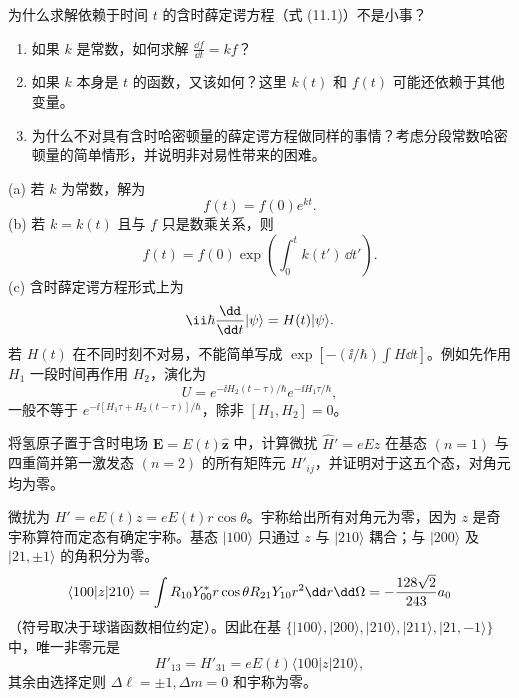 \begin{question}
为什么求解依赖于时间 $t$ 的含时薛定谔方程（式 (11.1)）不是小事？
\begin{enumerate}
\item 如果 $k$ 是常数，如何求解 $\frac{\dd f}{\dd t}=kf$？
\item 如果 $k$ 本身是 $t$ 的函数，又该如何？这里 $k(t)$ 和 $f(t)$ 可能还依赖于其他变量。
\item 为什么不对具有含时哈密顿量的薛定谔方程做同样的事情？考虑分段常数哈密顿量的简单情形，并说明非对易性带来的困难。
\end{enumerate}

\par\smallskip
{}

\end{question}
\begin{solution}
(a) 若 $k$ 为常数，解为
\[
f(t)=f(0)e^{kt}.
\]
(b) 若 $k=k(t)$ 且与 $f$ 只是数乘关系，则
\[
f(t)=f(0)\exp\left(\int_0^t k(t')\,\dd t'\right).
\]
(c) 含时薛定谔方程形式上为
\[
\ii\hbar{\dd\over\dd t}|\psi\rangle=H(t)|\psi\rangle.
\]
若 $H(t)$ 在不同时刻不对易，不能简单写成 $\exp[-(\ii/\hbar)\int H\dd t]$。例如先作用 $H_1$ 一段时间再作用 $H_2$，演化为
\[
U=e^{-\ii H_2(t-\tau)/\hbar}e^{-\ii H_1\tau/\hbar},
\]
一般不等于 $e^{-\ii[H_1\tau+H_2(t-\tau)]/\hbar}$，除非 $[H_1,H_2]=0$。
\end{solution}

\begin{question}
将氢原子置于含时电场 $\mathbf E=E(t)\hat{\mathbf z}$ 中，计算微扰 $\hat H'=eEz$ 在基态 $(n=1)$ 与四重简并第一激发态 $(n=2)$ 的所有矩阵元 $H'_{ij}$，并证明对于这五个态，对角元均为零。
\end{question}
\begin{solution}
微扰为 $H'=eE(t)z=eE(t)r\cos\theta$。宇称给出所有对角元为零，因为 $z$ 是奇宇称算符而定态有确定宇称。基态 $|100\rangle$ 只通过 $z$ 与 $|210\rangle$ 耦合；与 $|200\rangle$ 及 $|21,\pm1\rangle$ 的角积分为零。
\[
\langle100|z|210\rangle=\int R_{10}Y_{00}^*r\cos\theta R_{21}Y_{10}r^2\dd r\dd\Omega
=-{128\sqrt2\over243}a_0
\]
（符号取决于球谐函数相位约定）。因此在基 $\{|100\rangle,|200\rangle,|210\rangle,|211\rangle,|21,-1\rangle\}$ 中，唯一非零元是
\[
H'_{13}=H'_{31}=eE(t)\langle100|z|210\rangle,
\]
其余由选择定则 $\Delta\ell=\pm1,\Delta m=0$ 和宇称为零。
\end{solution}

